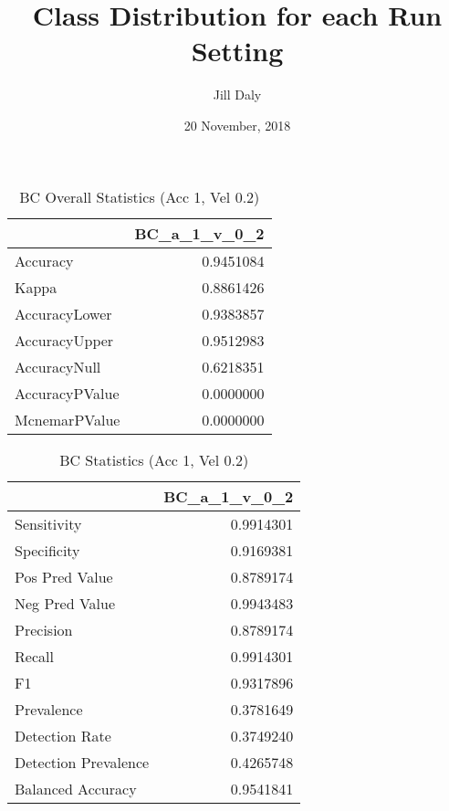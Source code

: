 \documentclass[]{article}
\title{Class Distribution for each Run Setting}
\author{Jill Daly}
\date{20 November, 2018}
\begin{document}
\maketitle

\begin{table}[!h]

\caption{\label{tab:imu11_acc_1_0_2_desc_chunk}Class Distribution for LSM State Labels}
\centering
{}
\end{table}

\begin{table}[!h]

\caption{\label{tab:bc_accuracy_chunk}BC Overall Statistics (Acc 1, Vel 0.2)}
\centering
\begin{tabular}[t]{lr}
\toprule
  & BC\_a\_1\_v\_0\_2\\
\midrule
Accuracy & 0.9451084\\
Kappa & 0.8861426\\
AccuracyLower & 0.9383857\\
AccuracyUpper & 0.9512983\\
AccuracyNull & 0.6218351\\
\addlinespace
AccuracyPValue & 0.0000000\\
McnemarPValue & 0.0000000\\
\bottomrule
\end{tabular}
\end{table}

\begin{table}[!h]

\caption{\label{tab:bc_accuracy_chunk}BC Statistics (Acc 1, Vel 0.2)}
\centering
\begin{tabular}[t]{lr}
\toprule
  & BC\_a\_1\_v\_0\_2\\
\midrule
Sensitivity & 0.9914301\\
Specificity & 0.9169381\\
Pos Pred Value & 0.8789174\\
Neg Pred Value & 0.9943483\\
Precision & 0.8789174\\
\addlinespace
Recall & 0.9914301\\
F1 & 0.9317896\\
Prevalence & 0.3781649\\
Detection Rate & 0.3749240\\
Detection Prevalence & 0.4265748\\
Balanced Accuracy & 0.9541841\\
\bottomrule
\end{tabular}
\end{table}
\end{document}
